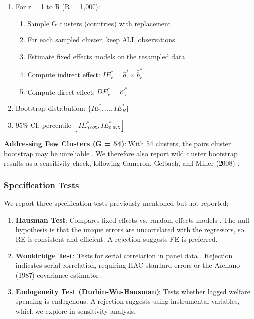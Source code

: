\documentclass[11pt,letterpaper]{article}
\begin{document}
\begin{enumerate}
  \item For r = 1 to R (R = 1,000):
    \begin{enumerate}
      \item Sample G clusters (countries) with replacement
      \item For each sampled cluster, keep ALL observations
      \item Estimate fixed effects models on the resampled data
      \item Compute indirect effect: $IE^*_r = \hat{a}^*_r \times \hat{b}^*_r$
      \item Compute direct effect: $DE^*_r = \hat{c}'^*_r$
    \end{enumerate}
  \item Bootstrap distribution: $\{IE^*_1,..., IE^*_R\}$
  \item 95\% CI: percentile $[IE^*_{0.025}, IE^*_{0.975}]$
\end{enumerate}

\textbf{Addressing Few Clusters (G = 54)}: With 54 clusters, the pairs cluster bootstrap may be unreliable \cite{Cameron2015}. We therefore also report wild cluster bootstrap results as a sensitivity check, following Cameron, Gelbach, and Miller (2008) \cite{Cameron2008}.

\subsubsection{Specification Tests}

We report three specification tests previously mentioned but not reported:

\begin{enumerate}
  \item \textbf{Hausman Test}: Compares fixed-effects vs. random-effects models \cite{Hausman1978}. The null hypothesis is that the unique errors are uncorrelated with the regressors, so RE is consistent and efficient. A rejection suggests FE is preferred.

  \item \textbf{Wooldridge Test}: Tests for serial correlation in panel data \cite{Wooldridge2002}. Rejection indicates serial correlation, requiring HAC standard errors or the Arellano (1987) covariance estimator \cite{Arellano1987}.

  \item \textbf{Endogeneity Test (Durbin-Wu-Hausman)}: Tests whether lagged welfare spending is endogenous. A rejection suggests using instrumental variables, which we explore in sensitivity analysis.
\end{enumerate}
\end{document}
